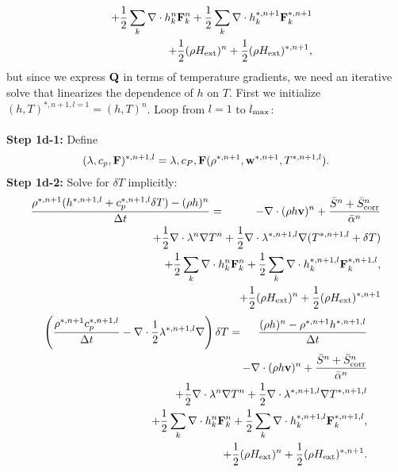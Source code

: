 \documentclass[final]{siamltex}
\def\Fb {{\bf F}}
\def\Qb {{\bf Q}}
\def\vb {{\bf v}}
\def\wb {{\bf w}}
\def\Hext {H_{\rm ext}}
\def\half   {\frac{1}{2}}
\begin{document}
\begin{itemize}
\begin{eqnarray}
&&+ \half\sum_k\nabla\cdot h_k^n\Fb_k^n + \half\sum_k\nabla\cdot h_k^{*,n+1}\Fb_k^{*,n+1}\nonumber\\
&&+ \half(\rho\Hext)^n + \half(\rho\Hext)^{*,n+1},
\end{eqnarray}
but since we express $\Qb$ in terms of temperature gradients, we need an iterative
solve that linearizes the dependence of $h$ on $T$.  First we initialize
$(h,T)^{*,n+1,l=1} = (h,T)^n$.
Loop from $l=1$ to $l_{\rm max}$:\\ \\
{\bf Step 1d-1:} Define
\begin{equation}
(\lambda,c_p,\Fb)^{*,n+1,l} = \lambda,c_P,\Fb(\rho^{*,n+1},\wb^{*,n+1},T^{*,n+1,l}).
\end{equation}
{\bf Step 1d-2:} Solve for $\delta T$ implicitly:
\begin{eqnarray}
\frac{\rho^{*,n+1}(h^{*,n+1,l} + c_p^{*,n+1,l}\delta T) - (\rho h)^n}{\Delta t} &=&
-\nabla\cdot(\rho h\vb)^n + \frac{\bar{S}^n + \bar{S}_{\rm corr}^n}{\bar{\alpha}^n} \nonumber\\
&&\hspace{-1in} + \half\nabla\cdot\lambda^n\nabla T^n + \half\nabla\cdot\lambda^{*,n+1,l}\nabla(T^{*,n+1,l} + \delta T)\nonumber\\
&&\hspace{-1in} + \half\sum_k\nabla\cdot h_k^n \Fb_k^n + \half\sum_k\nabla\cdot h_k^{*,n+1,l} \Fb_k^{*,n+1,l},\nonumber\\
&&\hspace{-1in} + \half(\rho\Hext)^n + \half(\rho\Hext)^{*,n+1}
\end{eqnarray}
\begin{eqnarray}
\left(\frac{\rho^{*,n+1}c_p^{*,n+1,l}}{\Delta t} - \nabla\cdot\frac{1}{2}\lambda^{*,n+1,l}\nabla\right)\delta T &=& \frac{(\rho h)^n - \rho^{*,n+1}h^{*,n+1,l}}{\Delta t}\nonumber\\
&&\hspace{-1.25in} - \nabla\cdot(\rho h\vb)^n + \frac{\bar{S}^n + \bar{S}_{\rm corr}^n}{\bar{\alpha}^n}\nonumber\\
&&\hspace{-1.25in} + \half\nabla\cdot\lambda^n\nabla T^n + \half\nabla\cdot\lambda^{*,n+1,l}\nabla T^{*,n+1,l}\nonumber\\
&&\hspace{-1.25in} + \half\sum_k\nabla\cdot h_k^n \Fb_k^n + \half\sum_k\nabla\cdot h_k^{*,n+1,l} \Fb_k^{*,n+1,l},\nonumber\\
&&\hspace{-1.25in} + \half(\rho\Hext)^n + \half(\rho\Hext)^{*,n+1}.
\end{eqnarray}


\end{itemize}
\end{document}
